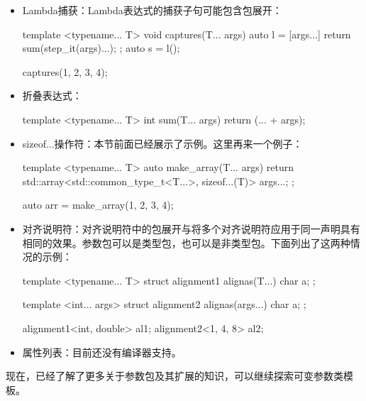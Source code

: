 \begin{itemize}
\begin{cpp}
{	using Bases::execute...;
};

A a;
B b;
C c;
X x(a, b, c);

x.A::execute();
x.B::execute();
x.C::execute();
\end{cpp}

\item
Lambda捕获：Lambda表达式的捕获子句可能包含包展开：

\begin{cpp}
template <typename... T>
void captures(T... args)
{
	auto l = [args...]{
		        return sum(step_it(args)...); };
	auto s = l();
}

captures(1, 2, 3, 4);
\end{cpp}

\item
折叠表达式：

\begin{cpp}
template <typename... T>
int sum(T... args)
{
	return (... + args);
}
\end{cpp}

\item
sizeof...操作符：本节前面已经展示了示例。这里再来一个例子：

\begin{cpp}
template <typename... T>
auto make_array(T... args)
{
	return std::array<std::common_type_t<T...>,
	                  sizeof...(T)> {args...};
};

auto arr = make_array(1, 2, 3, 4);
\end{cpp}

\item
对齐说明符：对齐说明符中的包展开与将多个对齐说明符应用于同一声明具有相同的效果。参数包可以是类型包，也可以是非类型包。下面列出了这两种情况的示例：

\begin{cpp}
template <typename... T>
struct alignment1
{
	alignas(T...) char a;
};

template <int... args>
struct alignment2
{
	alignas(args...) char a;
};

alignment1<int, double> al1;
alignment2<1, 4, 8> al2;
\end{cpp}

\item
属性列表：目前还没有编译器支持。
\end{itemize}

现在，已经了解了更多关于参数包及其扩展的知识，可以继续探索可变参数类模板。








